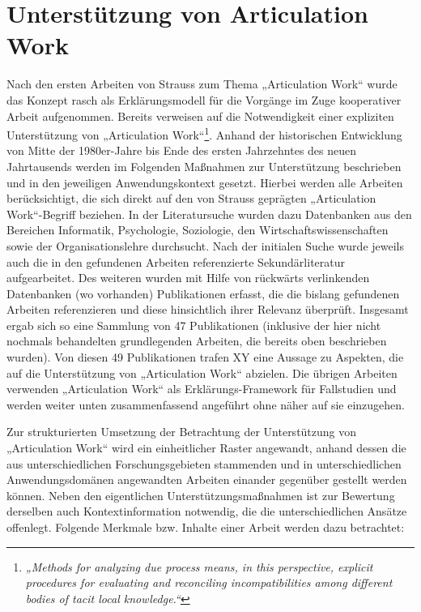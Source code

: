 
\section{Unterstützung von Articulation Work} %
\label{sec:unterstützung_von_articulation_work}

Nach den ersten Arbeiten von Strauss zum Thema „Articulation Work“ wurde das Konzept rasch als Erklärungsmodell für die Vorgänge im Zuge kooperativer Arbeit aufgenommen. Bereits \citeyear{Gerson86} verweisen \citeauthor{Gerson86} auf die Notwendigkeit einer expliziten Unterstützung von „Articulation Work“\footnote{\emph{„Methods for analyzing 
due process means, in this perspective, explicit procedures for evaluating and reconciling incompatibilities among different bodies of tacit local knowledge.“}\citep[][S. 266]{Gerson86}}. Anhand der historischen Entwicklung von Mitte der 1980er-Jahre bis Ende des ersten Jahrzehntes des neuen Jahrtausends werden im Folgenden Maßnahmen zur Unterstützung beschrieben und in den jeweiligen Anwendungskontext gesetzt. Hierbei werden alle Arbeiten berücksichtigt, die sich direkt auf den von Strauss geprägten „Articulation Work“-Begriff beziehen. In der Literatursuche wurden dazu Datenbanken aus den Bereichen Informatik, Psychologie, Soziologie, den Wirtschaftswissenschaften sowie der Organisationslehre durchsucht. Nach der initialen Suche wurde jeweils auch die in den gefundenen Arbeiten referenzierte Sekundärliteratur aufgearbeitet. Des weiteren wurden mit Hilfe von rückwärts verlinkenden Datenbanken (wo vorhanden) Publikationen erfasst, die die bislang gefundenen Arbeiten referenzieren und diese hinsichtlich ihrer Relevanz überprüft. Insgesamt ergab sich so eine Sammlung von 47 Publikationen (inklusive der hier nicht nochmals behandelten grundlegenden Arbeiten, die bereits oben beschrieben wurden). Von diesen 49 Publikationen trafen XY eine Aussage zu Aspekten, die auf die Unterstützung von „Articulation Work“ abzielen. Die übrigen Arbeiten verwenden „Articulation Work“ als Erklärungs-Framework für Fallstudien und werden weiter unten zusammenfassend angeführt ohne näher auf sie einzugehen.

Zur strukturierten Umsetzung der Betrachtung der Unterstützung von „Articulation Work“ wird ein einheitlicher Raster angewandt, anhand dessen die aus unterschiedlichen Forschungsgebieten stammenden und in unterschiedlichen Anwendungsdomänen angewandten Arbeiten einander gegenüber gestellt werden können. Neben den eigentlichen Unterstützungsmaßnahmen ist zur Bewertung derselben auch Kontextinformation notwendig, die die unterschiedlichen Ansätze offenlegt. Folgende Merkmale bzw. Inhalte einer Arbeit werden dazu betrachtet:

